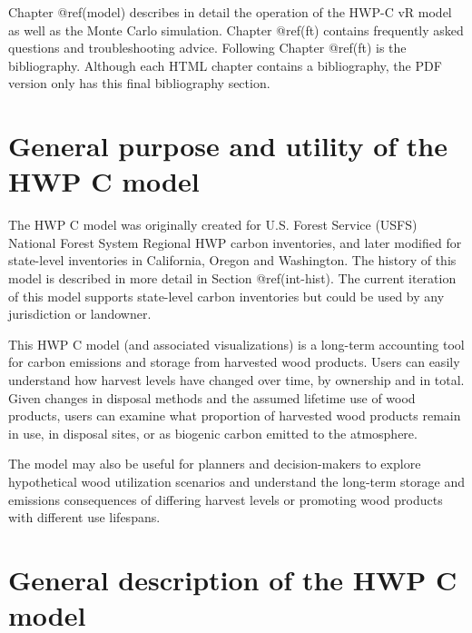 \documentclass[
  openany]{book}
\begin{document}
Chapter @ref(model) describes in detail the operation of the HWP-C vR
model as well as the Monte Carlo simulation. Chapter @ref(ft) contains
frequently asked questions and troubleshooting advice. Following Chapter
@ref(ft) is the bibliography. Although each HTML chapter contains a
bibliography, the PDF version only has this final bibliography section.

\hypertarget{int-purp}{%
\section{General purpose and utility of the HWP C
model}\label{int-purp}}

The HWP C model was originally created for U.S. Forest Service (USFS)
National Forest System Regional HWP carbon inventories, and later
modified for state-level inventories in California, Oregon and
Washington. The history of this model is described in more detail in
Section @ref(int-hist). The current iteration of this model supports
state-level carbon inventories but could be used by any jurisdiction or
landowner.

This HWP C model (and associated visualizations) is a long-term
accounting tool for carbon emissions and storage from harvested wood
products. Users can easily understand how harvest levels have changed
over time, by ownership and in total. Given changes in disposal methods
and the assumed lifetime use of wood products, users can examine what
proportion of harvested wood products remain in use, in disposal sites,
or as biogenic carbon emitted to the atmosphere.

The model may also be useful for planners and decision-makers to explore
hypothetical wood utilization scenarios and understand the long-term
storage and emissions consequences of differing harvest levels or
promoting wood products with different use lifespans.

\hypertarget{int-gen}{%
\section{General description of the HWP C model}\label{int-gen}}
\end{document}
